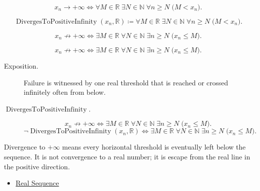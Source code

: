 \begin{remark*}
\[
x_n\to+\infty
\Longleftrightarrow
\forall M\in\mathbb{R}\;\exists N\in\mathbb{N}\;\forall n\ge N
\;\bigl(M<x_n\bigr).
\]
\end{remark*}

\begin{remark*}
\[
\operatorname{DivergesToPositiveInfinity}(x_n,\mathbb{R})
\coloneqq
\forall M\in\mathbb{R}\;\exists N\in\mathbb{N}\;\forall n\ge N
\;\bigl(M<x_n\bigr).
\]
\end{remark*}

\begin{remark*}
\[
x_n\not\to+\infty
\Longleftrightarrow
\exists M\in\mathbb{R}\;\forall N\in\mathbb{N}\;\exists n\ge N
\;\bigl(x_n\le M\bigr).
\]
\end{remark*}

\begin{remark*}
\[
x_n\not\to+\infty
\Longleftrightarrow
\exists M\in\mathbb{R}\;\forall N\in\mathbb{N}\;\exists n\ge N
\;\bigl(x_n\le M\bigr).
\]
\end{remark*}



\begin{remark*}
\begin{description}
  \item[Exposition.]
Failure is witnessed by one real threshold that is reached or crossed
infinitely often from below.
  \item[\(\operatorname{DivergesToPositiveInfinity}.\)]
\[
x_n\not\to+\infty
\Longleftrightarrow
\exists M\in\mathbb{R}\;\forall N\in\mathbb{N}\;\exists n\ge N
\;\bigl(x_n\le M\bigr).
\]
\[
\neg\operatorname{DivergesToPositiveInfinity}(x_n,\mathbb{R})
\Longleftrightarrow
\exists M\in\mathbb{R}\;\forall N\in\mathbb{N}\;\exists n\ge N
\;\bigl(x_n\le M\bigr).
\]
\end{description}
\end{remark*}

\begin{remark*}[Interpretation]
Divergence to $+\infty$ means every horizontal threshold is eventually left
below the sequence. It is not convergence to a real number; it is escape from
the real line in the positive direction.
\end{remark*}

\begin{dependencies}
\begin{itemize}
  \item \hyperref[def:real-sequence]{Real Sequence}
\end{itemize}
\end{dependencies}

